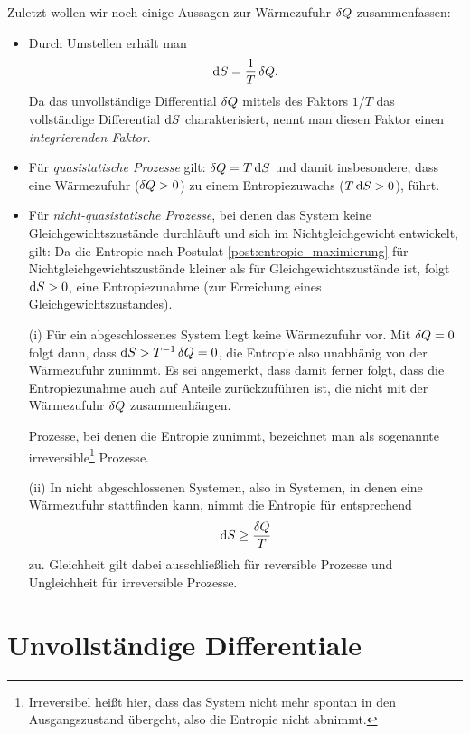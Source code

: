 Zuletzt wollen wir noch einige Aussagen zur Wärmezufuhr $\mathop{}\!\delta Q$ zusammenfassen:
\begin{itemize}
    \item Durch Umstellen erhält man
          \begin{align*}
              \mathop{}\!\mathrm{d} S = \frac{1}{T}\mathop{}\!\delta Q.
          \end{align*}
          Da das unvollständige Differential $\mathop{}\!\delta Q$ mittels des Faktors $1/T$ das vollständige Differential $\mathop{}\!\mathrm{d} S$ charakterisiert, nennt man diesen Faktor einen \emph{integrierenden Faktor}.
    \item Für \emph{quasistatische Prozesse} gilt: $\mathop{}\!\delta Q=T\mathop{}\!\mathrm{d} S$ und damit insbesondere, dass eine Wärmezufuhr (${\mathop{}\!\delta Q>0}$) zu einem Entropiezuwachs (${T\mathop{}\!\mathrm{d} S>0}$), führt. 
    \item Für \emph{nicht-quasistatische Prozesse}, bei denen das System keine Gleichgewichtszustände durchläuft und sich im Nichtgleichgewicht entwickelt, gilt: Da die Entropie nach Postulat \ref{post:entropie_maximierung} für Nichtgleichgewichtszustände kleiner als für Gleichgewichtszustände ist, folgt $\mathop{}\!\mathrm{d} S > 0$, eine Entropiezunahme (zur Erreichung eines Gleichgewichtszustandes).
    
    (i) Für ein abgeschlossenes System liegt keine Wärmezufuhr vor. Mit $\mathop{}\!\delta Q=0$ folgt dann, dass $\mathop{}\!\mathrm{d} S >T^{-1}\mathop{}\!\delta Q =0$, die Entropie also unabhänig von der Wärmezufuhr zunimmt. Es sei angemerkt, dass damit ferner folgt, dass die Entropiezunahme auch auf Anteile zurückzuführen ist, die nicht mit der Wärmezufuhr $\mathop{}\!\delta Q$ zusammenhängen.
          
    Prozesse, bei denen die Entropie zunimmt, bezeichnet man als sogenannte irreversible\footnote{Irreversibel heißt hier, dass das System nicht mehr spontan in den Ausgangszustand übergeht, also die Entropie nicht abnimmt.} Prozesse. 
          
    (ii) In nicht abgeschlossenen Systemen, also in Systemen, in denen eine Wärmezufuhr stattfinden kann, nimmt die Entropie für entsprechend
        \begin{align*}
            \mathop{}\!\mathrm{d} S\geq \frac{\mathop{}\!\delta Q}{T}
        \end{align*}
    zu.
    Gleichheit gilt dabei ausschließlich für reversible Prozesse und Ungleichheit für irreversible Prozesse.
\end{itemize}

\section{Unvollständige Differentiale}

